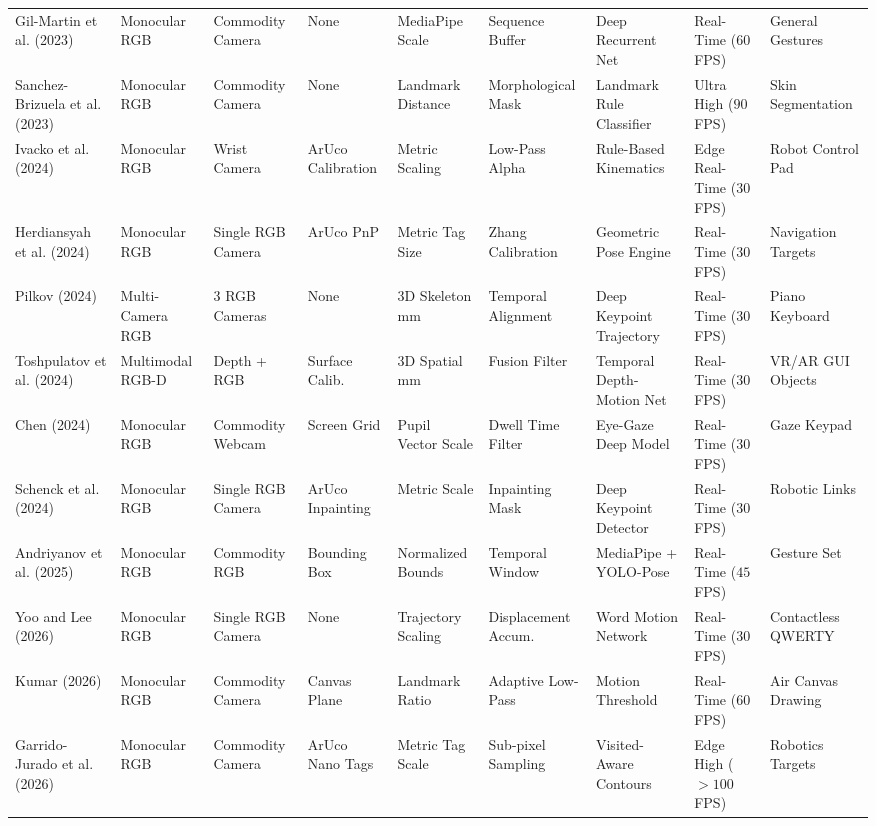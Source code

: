 \begin{table}[htbp]
\begin{tabular}{l l l l l l l l l}
Gil-Martin et al. (2023) \cite{GilMartin2023Hand} & Monocular RGB & Commodity Camera & None & MediaPipe Scale & Sequence Buffer & Deep Recurrent Net & Real-Time ($60$ FPS) & General Gestures \\
Sanchez-Brizuela et al. (2023) \cite{SanchezBrizuela2023Lightweight} & Monocular RGB & Commodity Camera & None & Landmark Distance & Morphological Mask & Landmark Rule Classifier & Ultra High ($90$ FPS) & Skin Segmentation \\
Ivacko et al. (2024) \cite{Ivacko2024Edge} & Monocular RGB & Wrist Camera & ArUco Calibration & Metric Scaling & Low-Pass Alpha & Rule-Based Kinematics & Edge Real-Time ($30$ FPS) & Robot Control Pad \\
Herdiansyah et al. (2024) \cite{Herdiansyah2024Implementation} & Monocular RGB & Single RGB Camera & ArUco PnP & Metric Tag Size & Zhang Calibration & Geometric Pose Engine & Real-Time ($30$ FPS) & Navigation Targets \\
Pilkov (2024) \cite{Pilkov2024Markerless} & Multi-Camera RGB & 3 RGB Cameras & None & 3D Skeleton mm & Temporal Alignment & Deep Keypoint Trajectory & Real-Time ($30$ FPS) & Piano Keyboard \\
Toshpulatov et al. (2024) \cite{Toshpulatov2024RealTime} & Multimodal RGB-D & Depth + RGB & Surface Calib. & 3D Spatial mm & Fusion Filter & Temporal Depth-Motion Net & Real-Time ($30$ FPS) & VR/AR GUI Objects \\
Chen (2024) \cite{Chen2024Gaze} & Monocular RGB & Commodity Webcam & Screen Grid & Pupil Vector Scale & Dwell Time Filter & Eye-Gaze Deep Model & Real-Time ($30$ FPS) & Gaze Keypad \\
Schenck et al. (2024) \cite{Schenck2024Utilizing} & Monocular RGB & Single RGB Camera & ArUco Inpainting & Metric Scale & Inpainting Mask & Deep Keypoint Detector & Real-Time ($30$ FPS) & Robotic Links \\
Andriyanov et al. (2025) \cite{Andriyanov2025Improving} & Monocular RGB & Commodity RGB & Bounding Box & Normalized Bounds & Temporal Window & MediaPipe + YOLO-Pose & Real-Time ($45$ FPS) & Gesture Set \\
Yoo and Lee (2026) \cite{Yoo2026WordLevel} & Monocular RGB & Single RGB Camera & None & Trajectory Scaling & Displacement Accum. & Word Motion Network & Real-Time ($30$ FPS) & Contactless QWERTY \\
Kumar (2026) \cite{Kumar2026Hybrid} & Monocular RGB & Commodity Camera & Canvas Plane & Landmark Ratio & Adaptive Low-Pass & Motion Threshold & Real-Time ($60$ FPS) & Air Canvas Drawing \\
Garrido-Jurado et al. (2026) \cite{GarridoJurado2026ArUco} & Monocular RGB & Commodity Camera & ArUco Nano Tags & Metric Tag Scale & Sub-pixel Sampling & Visited-Aware Contours & Edge High ($> 100$ FPS) & Robotics Targets \\
\bottomrule
\end{tabular}%
\end{table}

